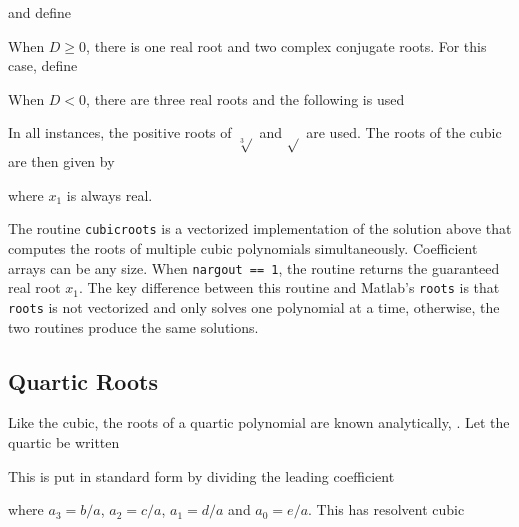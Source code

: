 and define

When $D\ge0$, there is one real root and two complex conjugate roots. For this case, define

When $D < 0$, there are three real roots and the following is used

In all instances, the positive roots of $\sqrt[3]{}$ and $\sqrt{}$ are used. The roots of the cubic are then given by 

\noindent where $x_1$ is always real.

The routine \texttt{cubicroots} is a vectorized implementation of the solution above that computes the roots of multiple cubic polynomials simultaneously. Coefficient arrays can be any size. When \texttt{nargout == 1}, the routine returns the guaranteed real root $x_1$. The key difference between this routine and Matlab's \texttt{roots} is that \texttt{roots} is not vectorized and only solves one polynomial at a time, otherwise, the two routines produce the same solutions.

{\footnotesize
{}
}

\subsection{Quartic Roots}

Like the cubic, the roots of a quartic polynomial are known analytically, \cite{weisstein_quartic}.  Let the quartic be written 

This is put in standard form by dividing the leading coefficient

\noindent where $a_3 = b/a$, $a_2 = c/a$, $a_1 = d/a$ and $a_0 = e/a$.  This has resolvent cubic

